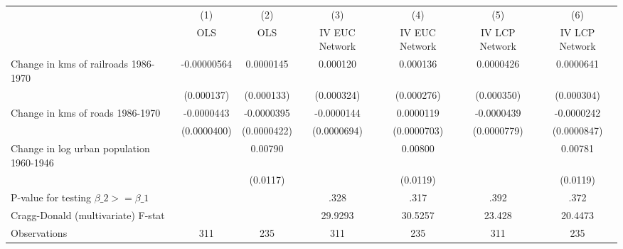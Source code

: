 {
\def\sym#1{\ifmmode^{#1}\else\(^{#1}\)\fi}
\begin{tabular}{l*{6}{c}}
\hline\hline
                &\multicolumn{1}{c}{(1)}&\multicolumn{1}{c}{(2)}&\multicolumn{1}{c}{(3)}&\multicolumn{1}{c}{(4)}&\multicolumn{1}{c}{(5)}&\multicolumn{1}{c}{(6)}\\
                &\multicolumn{1}{c}{OLS}&\multicolumn{1}{c}{OLS}&\multicolumn{1}{c}{IV EUC Network}&\multicolumn{1}{c}{IV EUC Network}&\multicolumn{1}{c}{IV LCP Network}&\multicolumn{1}{c}{IV LCP Network}\\
\hline
Change in kms of railroads 1986-1970&-0.00000564         &0.0000145         & 0.000120         & 0.000136         &0.0000426         &0.0000641         \\
                &(0.000137)         &(0.000133)         &(0.000324)         &(0.000276)         &(0.000350)         &(0.000304)         \\
[1em]
Change in kms of roads 1986-1970&-0.0000443         &-0.0000395         &-0.0000144         &0.0000119         &-0.0000439         &-0.0000242         \\
                &(0.0000400)         &(0.0000422)         &(0.0000694)         &(0.0000703)         &(0.0000779)         &(0.0000847)         \\
[1em]
Change in log urban population 1960-1946&                  &  0.00790         &                  &  0.00800         &                  &  0.00781         \\
                &                  & (0.0117)         &                  & (0.0119)         &                  & (0.0119)         \\
\hline
P-value for testing $\beta\_{2} >= \beta\_{1}$&                  &                  &     .328         &     .317         &     .392         &     .372         \\
Cragg-Donald (multivariate) F-stat&                  &                  &  29.9293         &  30.5257         &   23.428         &  20.4473         \\
Observations    &      311         &      235         &      311         &      235         &      311         &      235         \\
\hline\hline
\end{tabular}
}
